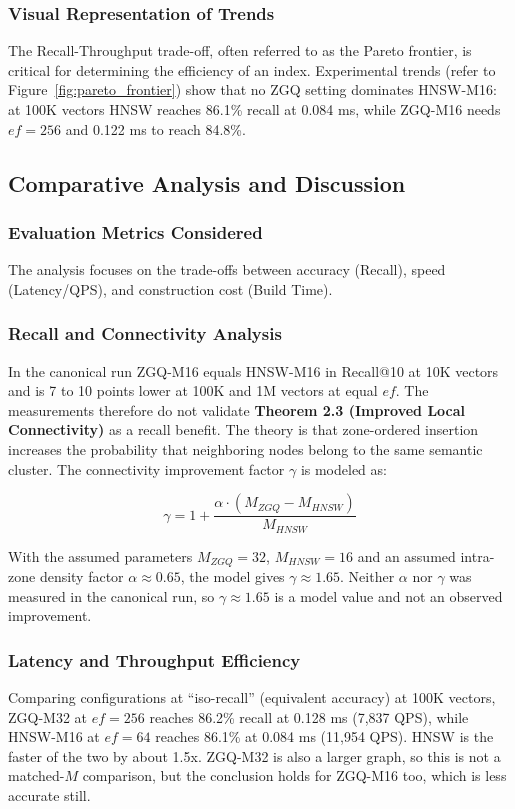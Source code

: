 \documentclass[conference]{IEEEtran}
\begin{document}
\subsubsection{Visual Representation of Trends}
The Recall-Throughput trade-off, often referred to as the Pareto frontier, is critical for determining the efficiency of an index. Experimental trends (refer to Figure~\ref{fig:pareto_frontier}) show that no ZGQ setting dominates HNSW-M16: at 100K vectors HNSW reaches 86.1\% recall at 0.084 ms, while ZGQ-M16 needs $ef=256$ and 0.122 ms to reach 84.8\%.

\subsection{Comparative Analysis and Discussion}

\subsubsection{Evaluation Metrics Considered}
The analysis focuses on the trade-offs between accuracy (Recall), speed (Latency/QPS), and construction cost (Build Time).

\subsubsection{Recall and Connectivity Analysis}
In the canonical run ZGQ-M16 equals HNSW-M16 in Recall@10 at 10K vectors and is 7 to 10 points lower at 100K and 1M vectors at equal $ef$. The measurements therefore do not validate \textbf{Theorem 2.3 (Improved Local Connectivity)} as a recall benefit. The theory is that zone-ordered insertion increases the probability that neighboring nodes belong to the same semantic cluster. The connectivity improvement factor $\gamma$ is modeled as:

\begin{equation}
\gamma = 1 + \frac{\alpha \cdot (M_{ZGQ} - M_{HNSW})}{M_{HNSW}}
\end{equation}

With the assumed parameters $M_{ZGQ}=32$, $M_{HNSW}=16$ and an assumed intra-zone density factor $\alpha \approx 0.65$, the model gives $\gamma \approx 1.65$. Neither $\alpha$ nor $\gamma$ was measured in the canonical run, so $\gamma \approx 1.65$ is a model value and not an observed improvement.

\subsubsection{Latency and Throughput Efficiency}
Comparing configurations at ``iso-recall'' (equivalent accuracy) at 100K vectors, ZGQ-M32 at $ef=256$ reaches 86.2\% recall at 0.128 ms (7,837 QPS), while HNSW-M16 at $ef=64$ reaches 86.1\% at 0.084 ms (11,954 QPS). HNSW is the faster of the two by about 1.5x. ZGQ-M32 is also a larger graph, so this is not a matched-$M$ comparison, but the conclusion holds for ZGQ-M16 too, which is less accurate still.
\end{document}
